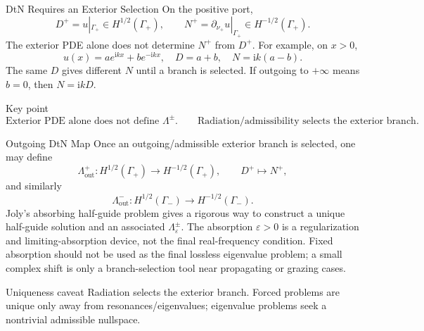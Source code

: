 \documentclass[aspectratio=169]{beamer}
\newcommand{\ii}{\mathrm{i}}
\begin{document}
\begin{frame}{DtN Requires an Exterior Selection}
  \small
  On the positive port,
  \[
    D^+=u|_{\Gamma_+}\in H^{1/2}(\Gamma_+),
    \qquad
    N^+=\partial_{\nu_+}u|_{\Gamma_+}\in H^{-1/2}(\Gamma_+).
  \]
  The exterior PDE alone does not determine \(N^+\) from \(D^+\).
  For example, on \(x>0\),
  \[
    u(x)=ae^{\ii kx}+be^{-\ii kx},
    \quad
    D=a+b,
    \quad
    N=\ii k(a-b).
  \]
  The same \(D\) gives different \(N\) until a branch is selected.
  If outgoing to \(+\infty\) means \(b=0\), then \(N=\ii kD\).
  \begin{alertblock}{Key point}
    \[
      \boxed{\text{Exterior PDE alone does not define }\Lambda^\pm.}
      \qquad
      \boxed{\text{Radiation/admissibility selects the exterior branch.}}
    \]
  \end{alertblock}
\end{frame}

\begin{frame}{Outgoing DtN Map}
  \small
  Once an outgoing/admissible exterior branch is selected, one may define
  \[
    \Lambda_{\mathrm{out}}^+:
    H^{1/2}(\Gamma_+)\to H^{-1/2}(\Gamma_+),
    \qquad
    D^+\mapsto N^+,
  \]
  and similarly
  \[
    \Lambda_{\mathrm{out}}^-:
    H^{1/2}(\Gamma_-)\to H^{-1/2}(\Gamma_-).
  \]
  Joly's absorbing half-guide problem gives a rigorous way to construct a
  unique half-guide solution and an associated
  \(\Lambda_\varepsilon^\pm\).
  The absorption \(\varepsilon>0\) is a regularization and
  limiting-absorption device, not the final real-frequency condition.
  Fixed absorption should not be used as the final lossless eigenvalue
  problem; a small complex shift is only a branch-selection tool near
  propagating or grazing cases.
  \begin{block}{Uniqueness caveat}
    Radiation selects the exterior branch. Forced problems are unique only
    away from resonances/eigenvalues; eigenvalue problems seek a nontrivial
    admissible nullspace.
  \end{block}
\end{frame}
\end{document}
